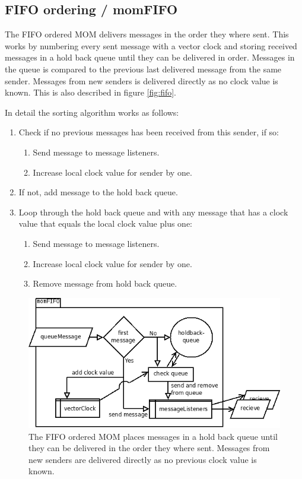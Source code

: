 \documentclass[english]{article}
\begin{document}
\subsection{FIFO ordering / momFIFO}
\label{mo-fifo}
The FIFO ordered MOM delivers messages in the order they where sent. This works by numbering every sent message with a vector clock and storing received messages in a hold back queue until they can be delivered in order. Messages in the queue is compared to the previous last delivered message from the same sender. Messages from new senders is delivered directly as no clock value is known. This is also described in figure \vref{fig:fifo}.

In detail the sorting algorithm works as follows:
\begin{enumerate}
\item Check if no previous messages has been received from this sender, if so:
	\begin{enumerate}
	\item Send message to message listeners.
	\item Increase local clock value for sender by one.
	\end{enumerate}
\item If not, add message to the hold back queue.
\item Loop through the hold back queue and with any message that has a clock value that equals the local clock value plus one:
	\begin{enumerate}
	\item Send message to message listeners.
	\item Increase local clock value for sender by one.
	\item Remove message from hold back queue.
	\end{enumerate}
\end{enumerate}

\begin{figure}
\includegraphics[width=\textwidth]{momFIFO.png}
\caption{The FIFO ordered MOM places messages in a hold back queue until they can be delivered in the order they where sent. Messages from new senders are delivered directly as no previous clock value is known.}
\label{fig:fifo}
\end{figure}
\end{document}
